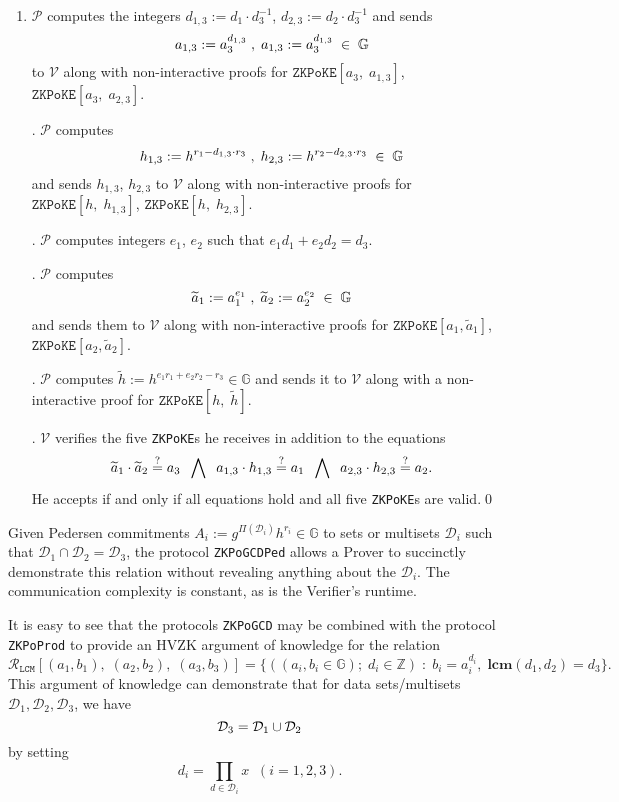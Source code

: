 \documentclass[11pt, lettersize, notitlepage, leqno, footskip=0.6cm]{article}
\newcommand{\bz}{\mathbb Z}
\newcommand{\ttt}{\texttt}
\newcommand{\bG}{\mathbb{G}}
\newcommand{\wti}{\widetilde}
\newcommand{\mc}{\mathcal}
\newcommand{\mb}{\mathbb}
\newcommand{\mbf}{\mathbf}
\newcommand{\mP}{\mc{P}}
\newcommand{\V}{\mc{V}}
\newcommand{\vs}{\vspace{-0.15cm}}
\newcommand{\noin}{\noindent}
\newcommand{\sta}{\stackrel{?}{=}}
\newcommand{\LCM}{\mbf{lcm}}
\numberwithin{equation}{section}
\begin{document}
\begin{enumerate}[wide, labelwidth=!, labelindent=0pt]\vs \item $\mP$ computes the integers $d_{1,3}:= d_1\cdot d_3^{-1}$, $d_{2,3}:= d_2\cdot d_3^{-1}$ and sends \vs $$a_{1,3}:= a_3^{d_{1,3}}\;,\;a_{1,3}:= a_3^{d_{1,3}}\;\in\;\bG \vs $$ to $\V$ along with non-interactive proofs for $\ttt{ZKPoKE}[a_3,\;a_{1,3}]$, $\ttt{ZKPoKE}[a_3,\;a_{2,3}]$.

\noin 2. $\mP$ computes \vs $$h_{1,3}:= h^{r_1 - d_{1,3}\cdot r_3}\;,\; h_{2,3}:= h^{r_2 - d_{2,3}\cdot r_3}\;\in\;\bG\vs $$ and sends $h_{1,3}$, $h_{2,3}$ to $\V$ along with non-interactive proofs for $\ttt{ZKPoKE}[h,\;h_{1,3}]$, $\ttt{ZKPoKE}[h,\;h_{2,3}]$.

\noin 3. $\mP$ computes integers $e_1$, $e_2$ such that $e_1d_1+e_2d_2 = d_3$. 

\noin 4. $\mP$ computes \vs $$ \wti{a}_1:= a_1^{e_1}\;,\;  \wti{a}_2:= a_2^{e_2}\;\in\;\bG \vs $$ and sends them to $\V$ along with non-interactive proofs for $\ttt{ZKPoKE}[a_1,\wti{a}_1]$, $\ttt{ZKPoKE}[a_2,\wti{a}_2]$.

\noin 5. $\mP$ computes $\wti{h}:= h^{e_1r_1+e_2r_2-r_3}\in \bG$ and sends it to $\V$ along with a non-interactive proof for $\ttt{ZKPoKE}[h,\;\wti{h}]$.

\noin 6. $\V$ verifies the five \verb|ZKPoKE|s he receives in addition to the equations \vs $$ \wti{a}_1\cdot \wti{a}_2\sta a_3 \;\;\bigwedge\;\;a_{1,3}\cdot h_{1,3}\sta a_1 \;\;\bigwedge\;\;a_{2,3}\cdot h_{2,3}\sta a_2 . \vs $$ He accepts if and only if all equations hold and all five \verb|ZKPoKE|s are valid.\qed \end{enumerate}

Given Pedersen commitments $A_i:= g^{\Pi(\mc{D}_i)}h^{r_i}\in \bG $ to sets or multisets $\mc{D}_i$ such that $\mc{D}_1\cap \mc{D}_2 = \mc{D}_3$, the protocol \verb|ZKPoGCDPed| allows a Prover to succinctly demonstrate this relation    without revealing anything about the $\mc{D}_i$. The communication complexity is constant, as is the Verifier's runtime.


\bigskip


It is easy to see that the protocols \verb|ZKPoGCD| may be combined with the protocol \verb|ZKPoProd| to provide an HVZK argument of knowledge for the relation \vs \[ \mc{R}_{{\ttt{LCM}}}[(a_1,b_1),\;(a_2,b_2), \; (a_3, b_3)] = \{((a_i, b_i\in\mb{G});\;d_i\in\bz)\;:\; b_i = a_i^{d_i},\;\LCM(d_1,d_2)=d_3 \} .\] This argument of knowledge can demonstrate that for data sets/multisets $\mc{D}_1,\mc{D}_2, \mc{D}_3$, we have \vs $$\mc{D}_3 = \mc{D}_1\cup \mc{D}_2 \vs $$ by setting \vs $$ d_i = \prod\limits_{d\in\mc{D}_i} x\;\;(i=1,2,3). $$
\end{document}
